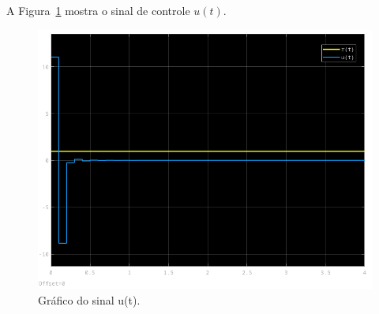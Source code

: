 \documentclass{article}
\begin{document}
        {A Figura~\ref{fig:q4_simulink_u} mostra o sinal de controle $u(t)$.}

        \begin{figure}[H]
           \centering
                \includegraphics[width=.6\linewidth]{images/q4_u_t.png}
                \caption{Gráfico do sinal u(t).}
                \label{fig:q4_simulink_u}
        \end{figure}
\end{document}
